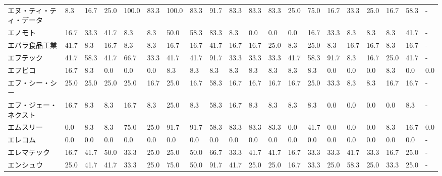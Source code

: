 \begin{tabular}{llllllllllllllllllll}
エヌ・ティ・ティ・データ    &    8.3 &   16.7 &      25.0 &     100.0 &       83.3 &  100.0 &   83.3 &   91.7 &    83.3 &    83.3 &   83.3 &  25.0 &   75.0 &    16.7 &    33.3 &  25.0 &  16.7 &  58.3 &     - \\
エノモト            &   16.7 &   33.3 &      41.7 &       8.3 &        8.3 &   50.0 &   58.3 &   83.3 &     8.3 &     0.0 &    0.0 &   0.0 &   16.7 &    33.3 &     8.3 &   8.3 &   8.3 &  41.7 &     - \\
エバラ食品工業         &   41.7 &    8.3 &      16.7 &       8.3 &        8.3 &   16.7 &   16.7 &   41.7 &    16.7 &    16.7 &   25.0 &   8.3 &   25.0 &     8.3 &    16.7 &  16.7 &   8.3 &  16.7 &     - \\
エフテック           &   41.7 &   58.3 &      41.7 &      66.7 &       33.3 &   41.7 &   41.7 &   91.7 &    33.3 &    33.3 &   33.3 &  41.7 &   58.3 &    91.7 &     8.3 &  16.7 &  25.0 &  41.7 &     - \\
エフピコ            &   16.7 &    8.3 &       0.0 &       0.0 &        0.0 &    8.3 &    8.3 &    8.3 &     8.3 &     8.3 &    8.3 &   8.3 &    8.3 &     0.0 &     0.0 &   0.0 &   8.3 &   0.0 &   0.0 \\
エフ・シー・シー        &   25.0 &   25.0 &      25.0 &      25.0 &       16.7 &   25.0 &   16.7 &   58.3 &    16.7 &    16.7 &   16.7 &  16.7 &   25.0 &    33.3 &     8.3 &   8.3 &  16.7 &  16.7 &     - \\
エフ・ジェー・ネクスト     &   16.7 &    8.3 &       8.3 &      16.7 &        8.3 &   25.0 &    8.3 &   58.3 &    16.7 &     8.3 &    8.3 &   8.3 &    8.3 &     0.0 &     0.0 &   0.0 &   0.0 &   8.3 &     - \\
エムスリー           &    0.0 &    8.3 &       8.3 &      75.0 &       25.0 &   91.7 &   91.7 &   58.3 &    83.3 &    83.3 &   83.3 &   0.0 &   41.7 &     0.0 &     0.0 &   0.0 &   8.3 &  16.7 &   0.0 \\
エレコム            &    0.0 &    0.0 &       0.0 &       0.0 &        0.0 &    0.0 &    0.0 &    0.0 &     0.0 &     0.0 &    0.0 &   0.0 &    0.0 &     0.0 &     0.0 &   0.0 &   0.0 &   0.0 &     - \\
エレマテック          &   16.7 &   41.7 &      50.0 &      33.3 &       25.0 &   25.0 &   50.0 &   66.7 &    33.3 &    41.7 &   41.7 &  16.7 &   33.3 &    33.3 &    41.7 &  33.3 &  16.7 &  25.0 &     - \\
エンシュウ           &   25.0 &   41.7 &      41.7 &      33.3 &       25.0 &   75.0 &   50.0 &   91.7 &    41.7 &    25.0 &   25.0 &  16.7 &   33.3 &    25.0 &    58.3 &  25.0 &  33.3 &  25.0 &     - \\

\end{tabular}
